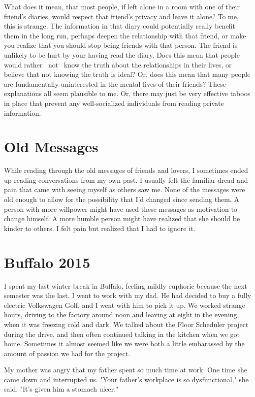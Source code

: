 \documentclass[12pt]{article}
\begin{document}
What does it mean, that most people, if left alone in a room with one of their
friend's diaries, would respect that friend's privacy and leave it alone?  To
me, this is strange.  The information in that diary could potentially really
benefit them in the long run, perhaps deepen the relationship with that friend,
or make you realize that you should stop being friends with that person.  The
friend is unlikely to be hurt by your having read the diary.  Does this mean
that people would rather ~not~ know the truth about the relationships in their
lives, or believe that not knowing the truth is ideal?  Or, does this mean that
many people are fundamentally uninterested in the mental lives of their friends?
These explanations all seem plausible to me.  Or, there may just be very
effective taboos in place that prevent any well-socialized individuals from
reading private information.

\section{Old Messages}
While reading through the old messages of friends and lovers, I sometimes ended
up reading conversations from my own past.  I usually felt the familiar dread
and pain that came  with seeing myself as others saw me.  None of the messages
were old enough to allow for the possibility that I'd changed since sending
them.  A person with more willpower might have used these messages as motivation
to change himself.  A more humble person might have realized that she should be
kinder to others.  I felt pain but realized that I had to ignore it.

\section{Buffalo 2015}
I spent my last winter break in Buffalo, feeling mildly euphoric because the
next semester was the last.  I went to work with my dad.  He had decided to buy
a fully electric Volkswagen Golf, and I went with him to pick it up.  We worked
strange hours, driving to the factory around noon and leaving at eight in the
evening, when it was freezing cold and dark.  We talked about the Floor
Scheduler project during the drive, and then often continued talking in the
kitchen when we got home.  Sometimes it almost seemed like we were both a little
embarassed by the amount of passion we had for the project. 

My mother was angry that my father spent so much time at work.  One time she
came down and interrupted us.  "Your father's workplace is so dysfunctional,"
she said.  "It's given him a stomach ulcer."  
\end{document}
